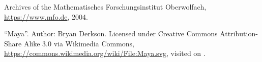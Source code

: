 \documentclass{snapshotmfo}
\begin{document}

\begin{imagecredits}
  \item[\Cref{fig.sample-image}] Archives of the Mathematisches Forschungsinstitut Oberwolfach,\\\url{https://www.mfo.de}, 2004.
  \item[\Cref{fig.maya}] ``Maya''. Author: Bryan Derkson. Licensed under Creative Commons Attribution-Share Alike 3.0 via Wikimedia Commons, \url{https://commons.wikimedia.org/wiki/File:Maya.svg}, visited on .
\end{imagecredits}


\end{document}
